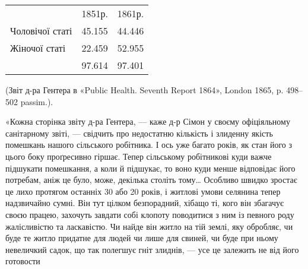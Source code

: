 {\begin{center}
\noindent\begin{tabularx}{0.4\textwidth}{X@{}cc}
& 1851р. & 1861р. \\
Чоловічої статі\dotfill{}& \num{45.155} & \num{44.446} \\
Жіночої статі\dotfill{}& \num{22.459} & \num{52.955} \\
\cmidrule(r){2-3}
& \num{97.614} & \num{97.401}
\end{tabularx}
\end{center}
(Звіт д-ра Гентера в «Public Health. Seventh Report 1864», London
1865, p. 498--502 passim.).
}

«Кожна сторінка звіту д-ра Гентера, — каже д-р Сімон
у своєму офіціяльному санітарному звіті, — свідчить про недостатню
кількість і злиденну якість помешкань нашого сільського
робітника. І ось уже багато років, як стан його з цього боку проґресивно
гіршає. Тепер сільському робітникові куди важче підшукати
помешкання, а коли й підшукає, то воно куди менше
відповідає його потребам, аніж це було, може, декілька століть
тому\dots{} Особливо швидко зростає це лихо протягом останніх 30
або 20 років, і житлові умови селянина тепер надзвичайно сумні.
Він тут цілком безпорадний, хібащо ті, кого він збагачує своєю
працею, захочуть завдати собі клопоту поводитися з ним із певного
роду жалісливістю та ласкавістю. Чи найде він житло на
тій землі, яку обробляє, чи буде те житло придатне для людей
чи лише для свиней, чи буде при ньому невеличкий садок, що так
полегшує гніт злиднів, — усе це залежить не від його готовости
\parbreak{}  %
